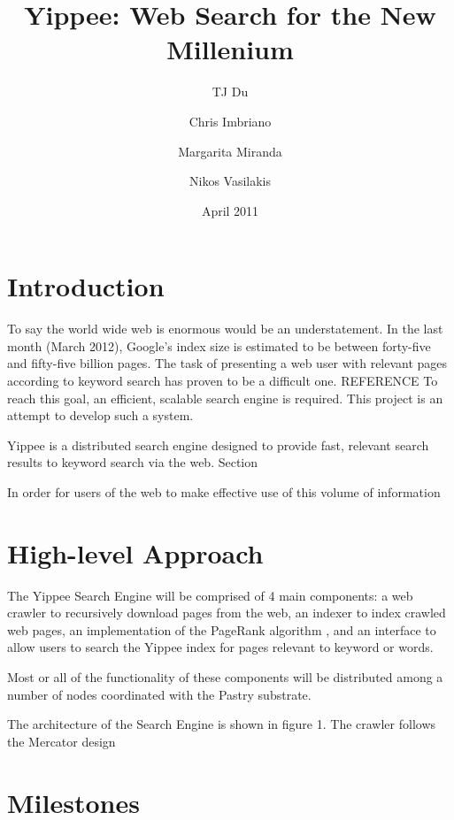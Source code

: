 \documentclass[11pt, letterpaper, oneside, twocolumn]{article}
\begin{document}
\title{Yippee: Web Search for the New Millenium}
\author{	TJ Du
	\and Chris Imbriano
	\and Margarita Miranda
	\and Nikos Vasilakis}
\date{April 2011}

\maketitle

\section{ Introduction }

To say the world wide web is enormous would be an understatement.  In the last month (March 2012),  Google's index size is estimated to be between forty-five and fifty-five billion pages. \cite{websize} The task of presenting a web user with relevant pages according to keyword search has proven to be a difficult one. \cite{}REFERENCE To reach this goal, an efficient, scalable search engine is required.  This project is an attempt to develop such a system.

Yippee is a distributed search engine designed to provide fast, relevant search results to keyword search via the web.  Section


In order for users of the web to make effective use of this volume of information 

\section{ High-level Approach }

The Yippee Search Engine will be comprised of 4 main components: a web crawler to recursively download pages from the web, an indexer to index crawled web pages, an implementation of the PageRank algorithm \cite{pagerank}, and an interface to allow users to search the Yippee index for pages relevant to keyword or words.

Most or all of the functionality of these components will be distributed among a number of nodes coordinated with the Pastry substrate. 

The architecture of the Search Engine is shown in figure 1. The crawler
follows the Mercator design\cite{mercator}

\section{ Milestones }
\end{document}
